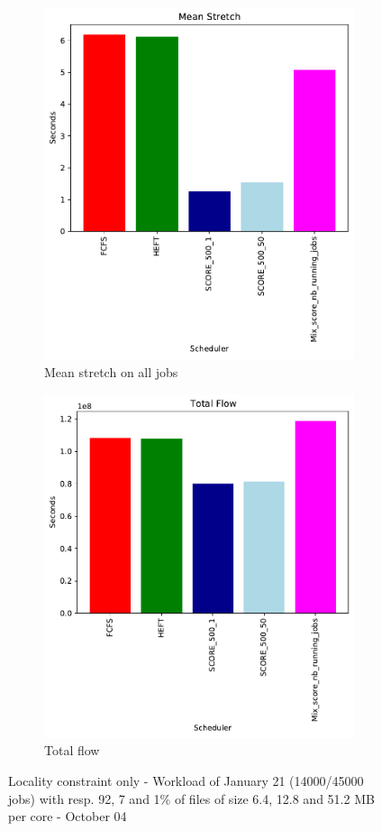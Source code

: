 \documentclass[a4paper]{article}
\begin{document}
\begin{figure}[H]
\begin{subfigure}[b]{0.4\linewidth}\centering\includegraphics[width=0.9\linewidth]{MBSS/plot/Results_FCFS_Score_Adaptative_Multiplier_2022-01-21->2022-01-21_V9271_Mean_Stretch_450_128_32_256_4_1024.pdf}\caption{Mean stretch on all jobs}\end{subfigure}
\begin{subfigure}[b]{0.4\linewidth}\centering\includegraphics[width=0.9\linewidth]{MBSS/plot/Results_FCFS_Score_Adaptative_Multiplier_2022-01-21->2022-01-21_V9271_Total_flow_450_128_32_256_4_1024.pdf}\caption{Total flow}\end{subfigure}
\caption{Locality constraint only - Workload of January 21 (14000/45000 jobs) with resp. 92, 7 and 1\% of files of size 6.4, 12.8 and 51.2 MB per core - October 04}\end{figure}
\end{document}
